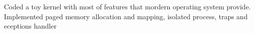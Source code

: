 \begin{cventry}
  \item Coded a toy kernel with most of features that mordern operating system provide. Implemented paged memory allocation and mapping, isolated process, traps and eceptions handler
\end{cventry}
